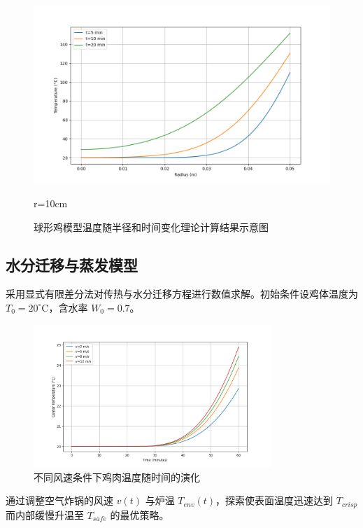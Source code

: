 \documentclass[12pt]{article}
\begin{document}
\begin{figure}[htbp]
\begin{minipage}{0.32\linewidth}
		\vspace{3pt}
		\centerline{\includegraphics[width=\textwidth]{heat_distribution3.png}}
		\centerline{r=10cm}
	\end{minipage}
	\caption{球形鸡模型温度随半径和时间变化理论计算结果示意图}
	\label{fig:chicken}
\end{figure}

\subsection{水分迁移与蒸发模型}
采用显式有限差分法对传热与水分迁移方程进行数值求解。初始条件设鸡体温度为 $T_0 = 20^\circ$C，含水率 $W_0 = 0.7$。

\begin{figure}[htbp]
\centering
\includegraphics[width=0.8\textwidth]{wind.jpg}
\caption{不同风速条件下鸡肉温度随时间的演化}
\end{figure}

通过调整空气炸锅的风速 $v(t)$ 与炉温 $T_{env}(t)$，探索使表面温度迅速达到 $T_{crisp}$ 而内部缓慢升温至 $T_{safe}$ 的最优策略。
\end{document}
